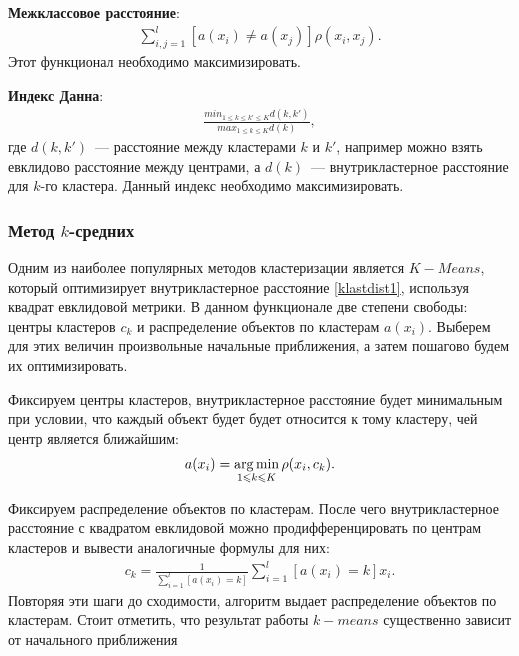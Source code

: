 \documentclass[12pt,a4paper]{article} %
\begin{document}
\textbf{Межклассовое расстояние}:
\begin{gather}\label{klastdist2}
\sum\limits_{i,j = 1}^{l}[a(x_i)\not=a(x_j)]\rho(x_i, x_j).
\end{gather}
Этот функционал необходимо максимизировать.

\textbf{Индекс Данна}:
\begin{gather}\label{klastdist3}
	\frac{min_{1\leq k\leq k'\leq K}d(k,k')}{max_{1\leq k\leq K}d(k)}, 
\end{gather}
где $d(k,k')$~--- расстояние между кластерами $k$ и $k'$, например можно взять евклидово расстояние между центрами, а $d(k)$~--- внутрикластерное расстояние для $k$-го кластера. Данный индекс необходимо максимизировать.

\subsubsection{Метод $k$-средних}

Одним из наиболее популярных методов кластеризации является $K-Means$, который оптимизирует внутрикластерное расстояние \ref{klastdist1}, используя квадрат евклидовой метрики. В данном функционале две степени свободы: центры кластеров $c_k$ и распределение объектов по кластерам $a(x_i)$. Выберем для этих величин произвольные начальные приближения, а затем пошагово будем их оптимизировать.

Фиксируем центры кластеров, внутрикластерное расстояние будет минимальным при условии, что каждый объект будет будет относится к тому кластеру, чей центр является ближайшим:
\begin{gather}\label{klastdist4}
	a(x_i) = \mathop{\rm arg\,min}\limits_{1\leqslant k\leqslant K} \rho(x_i, c_k).
\end{gather}

Фиксируем распределение объектов по кластерам. После чего внутрикластерное расстояние с квадратом евклидовой можно продифференцировать по центрам кластеров и вывести аналогичные формулы для них:
\begin{gather}\label{klastdist5}
c_k = \frac{1}{\sum\limits_{i=1}^{l}[a(x_i)= k]} \sum\limits_{i=1}^{l}[a(x_i)= k]x_i.
\end{gather}
Повторяя эти шаги до сходимости, алгоритм выдает распределение объектов по кластерам. Стоит отметить, что результат работы $k-means$ существенно зависит от начального приближения
\end{document}

